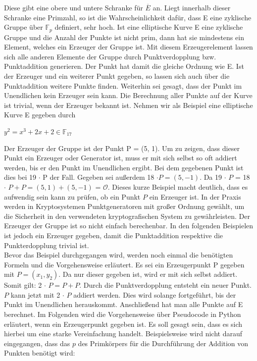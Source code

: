 Diese gibt eine obere und untere Schranke für $\overline{E}$ an. Liegt innerhalb dieser Schranke eine Primzahl, so ist die Wahrscheinlichkeit dafür, dass E eine zyklische Gruppe über $\mathbb{F}_{p}$ definiert, sehr hoch. Ist eine elliptische Kurve E eine zyklische Gruppe und die Anzahl der Punkte ist nicht prim, dann hat sie mindestens ein Element, welches ein Erzeuger der Gruppe ist. Mit diesem Erzeugerelement lassen sich alle anderen Elemente der Gruppe durch Punktverdopplung bzw. Punktaddition generieren. Der Punkt hat damit die gleiche Ordnung wie E. Ist der Erzeuger und ein weiterer Punkt gegeben, so lassen sich auch über die Punktaddition weitere Punkte finden. Weiterhin sei gesagt, dass der Punkt im Unendlichen kein Erzeuger sein kann. Die Berechnung aller Punkte auf der Kurve ist trivial, wenn der Erzeuger bekannt ist. Nehmen wir als Beispiel eine elliptische Kurve E gegeben durch
\begin{center}
$y^{2} =  x^{3} + 2x + 2 \in \mathbb{F}_{17}$
\end{center}

Der Erzeuger der Gruppe ist der Punkt P = (5, 1). Um zu zeigen, dass dieser Punkt ein Erzeuger oder Generator ist, muss er mit sich selbst so oft addiert werden, bis er den Punkt im Unendlichen ergibt. Bei dem gegebenen Punkt ist dies bei 19 $\cdot$ P der Fall. Gegeben sei außerdem 18 $\cdot P = (5, -1)$. Da 19 $\cdot$ $P$ = 18 $\cdot$ $P + P = (5, 1) + (5, -1)$ = $\mathcal O$. Dieses kurze Beispiel macht deutlich, dass es aufwendig sein kann zu prüfen, ob ein Punkt $P$ ein Erzeuger ist. In der Praxis werden in Kryptosystemen Punktgeneratoren mit großer Ordnung gewählt, um die Sicherheit in den verwendeten kryptografischen System zu gewährleisten. Der Erzeuger der Gruppe ist so nicht einfach berechenbar. In den folgenden Beispielen ist jedoch ein Erzeuger gegeben, damit die Punktaddition respektive die Punkterdopplung trivial ist.\\

Bevor das Beispiel durchgegangen wird, werden noch einmal die benötigten Formeln und die Vorgehensweise erläutert. Es sei ein Erzeugerpunkt P gegeben mit $P = (x_1, y_2)$. Da nur dieser gegeben ist, wird er mit sich selbst addiert. Somit gilt: 2 $\cdot$ $P = P + P$. Durch die Punktverdopplung entsteht ein neuer Punkt. $P$ kann jetzt mit 2 $\cdot$ $P$ addiert werden. Dies wird solange fortgeführt, bis der Punkt im Unendlichen herauskommt. Anschließend hat man alle Punkte auf E berechnet. Im Folgenden wird die Vorgehensweise über Pseudocode in Python erläutert, wenn ein Erzeugerpunkt gegeben ist. Es soll gesagt sein, dass es sich hierbei um eine starke Vereinfachung handelt. Beispielsweise wird nicht darauf eingegangen, dass das $p$ des Primkörpers für die Durchführung der Addition von Punkten benötigt wird:\\

